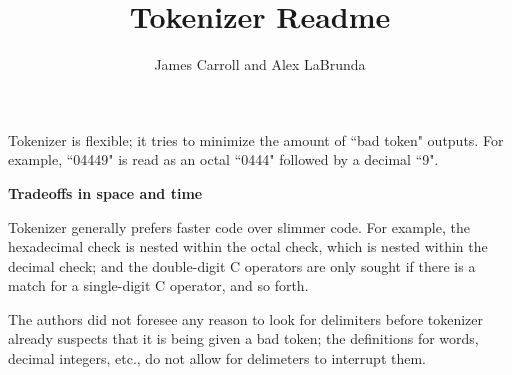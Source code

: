 \documentclass{article}
\title{Tokenizer Readme}
\author{James Carroll and Alex LaBrunda}
\begin{document}
\setlength{\parindent}{4em}
\setlength{\parskip}{1em}
\renewcommand{\baselinestretch}{2.0}

\maketitle
	Tokenizer is flexible; it tries to minimize the amount of ``bad token" outputs. For example, ``04449" is read as an octal ``0444" followed by a decimal ``9". \par
	
{\huge\bfseries Tradeoffs in space and time \par}

	Tokenizer generally prefers faster code over slimmer code. For example, the hexadecimal check is nested within the octal check, which is nested within the decimal check; and the double-digit C operators are only sought if there is a match for a single-digit C operator, and so forth. \par

	The authors did not foresee any reason to look for delimiters before tokenizer already suspects that it is being given a bad token; the definitions for words, decimal integers, etc., do not allow for delimeters to interrupt them.
\end{document}
